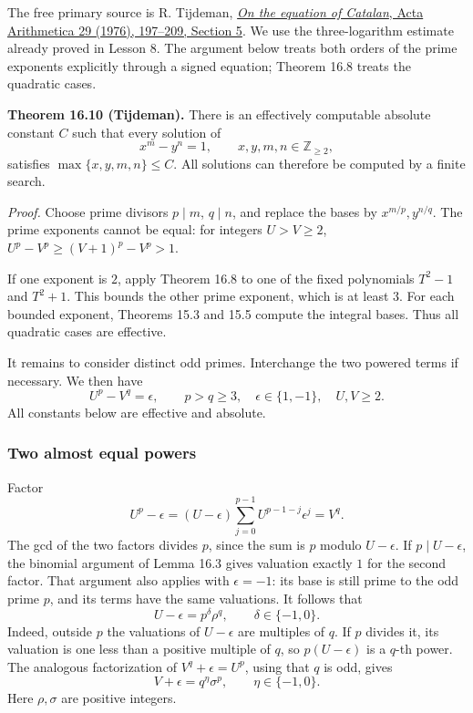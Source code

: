 \documentclass[
  11pt,
  a4paper,
]{article}
\begin{document}
The free primary source is R. Tijdeman,
\href{https://www.impan.pl/shop/en/publication/transaction/download/product/100989}{\emph{On
the equation of Catalan}, Acta Arithmetica 29 (1976), 197--209, Section
5}. We use the three-logarithm estimate already proved in Lesson 8. The
argument below treats both orders of the prime exponents explicitly
through a signed equation; Theorem 16.8 treats the quadratic cases.

\textbf{Theorem 16.10 (Tijdeman).} There is an effectively computable
absolute constant \(C\) such that every solution of \[
 x^m-y^n=1,\qquad x,y,m,n\in\mathbb Z_{\geq2},
 \tag{16.52}
\] satisfies \(\max\{x,y,m,n\}\leq C\). All solutions can therefore be
computed by a finite search.

\emph{Proof.} Choose prime divisors \(p\mid m\), \(q\mid n\), and
replace the bases by \(x^{m/p},y^{n/q}\). The prime exponents cannot be
equal: for integers \(U>V\geq2\), \(U^p-V^p\geq(V+1)^p-V^p>1\).

If one exponent is \(2\), apply Theorem 16.8 to one of the fixed
polynomials \(T^2-1\) and \(T^2+1\). This bounds the other prime
exponent, which is at least \(3\). For each bounded exponent, Theorems
15.3 and 15.5 compute the integral bases. Thus all quadratic cases are
effective.

It remains to consider distinct odd primes. Interchange the two powered
terms if necessary. We then have \[
 U^p-V^q=\epsilon,\qquad p>q\geq3,\quad
 \epsilon\in\{1,-1\},\quad U,V\geq2.
 \tag{16.53}
\] All constants below are effective and absolute.

\subsubsection{Two almost equal powers}\label{two-almost-equal-powers}

Factor \[
 U^p-\epsilon=(U-\epsilon)
     \sum_{j=0}^{p-1}U^{p-1-j}\epsilon^j=V^q.
 \tag{16.54}
\] The gcd of the two factors divides \(p\), since the sum is \(p\)
modulo \(U-\epsilon\). If \(p\mid U-\epsilon\), the binomial argument of
Lemma 16.3 gives valuation exactly \(1\) for the second factor. That
argument also applies with \(\epsilon=-1\): its base is still prime to
the odd prime \(p\), and its terms have the same valuations. It follows
that \[
 U-\epsilon=p^\delta\rho^q,\qquad \delta\in\{-1,0\}.
 \tag{16.55}
\] Indeed, outside \(p\) the valuations of \(U-\epsilon\) are multiples
of \(q\). If \(p\) divides it, its valuation is one less than a positive
multiple of \(q\), so \(p(U-\epsilon)\) is a \(q\)-th power. The
analogous factorization of \(V^q+\epsilon=U^p\), using that \(q\) is
odd, gives \[
 V+\epsilon=q^\eta\sigma^p,\qquad \eta\in\{-1,0\}.
 \tag{16.56}
\] Here \(\rho,\sigma\) are positive integers.
\end{document}
